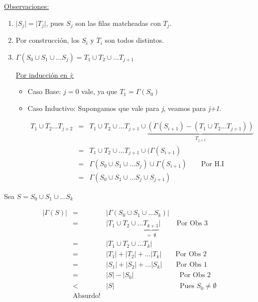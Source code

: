 \documentclass[12pt,a4paper]{report}
\newcounter{neq}
\begin{document}
			\vspace{5mm}
			\underline{Observaciones:}
			\begin{enumerate}
				\item $\lvert S_{j} \rvert = \lvert T_{j} \rvert$, pues $S_{j}$ son las filas matcheadas con $T_{j}$.
				\item Por construcción, los $S_{i}$ y $T_{i}$ son todos distintos.
				\item $\Gamma(S_{0} \cup S_{1} \cup \dotsc S_{j}) = T_{1} \cup T_{2} \cup \dotsc T_{j+1}$
				
					\underline{Por inducción en \textit{j}:}
					\begin{itemize}
						\item Caso Base: $j = 0$ vale, ya que $T_{1} = \Gamma(S_{0})$
						\item Caso Inductivo: Supongamos que vale para \textit{j}, veamos para \textit{j+1}.
						
						\begin{eqnarray}
							\nonumber T_{1} \cup T_{2} \dotsc T_{j+2} &=& T_{1} \cup T_{2} \cup \dotsc T_{j+1} \cup \underbrace{(\Gamma(S_{i+1}) - (T_{1} \cup T_{2} \dotsc T_{j+1}))}_{T_{j+1}} \\
							\nonumber &=& T_{1} \cup T_{2} \cup \dotsc T_{j+1} \cup (\Gamma(S_{i+1}) \\
							\nonumber &=& \Gamma(S_{0} \cup S_{1} \cup \dotsc S_{j}) \cup \Gamma(S_{i+1}) \qquad \text{Por H.I} \\
							\nonumber &=& \Gamma(S_{0} \cup S_{1} \cup \dotsc S_{j} \cup S_{j+1}) 
						\end{eqnarray}
					\end{itemize}
				\end{enumerate}
				
					Sea $S = S_{0} \cup S_{1} \cup \dotsc S_{k}$
					
					\begin{eqnarray}
						\nonumber \lvert \Gamma(S) \rvert &=& \lvert \Gamma(S_{0} \cup S_{1} \cup \dotsc S_{k}) \rvert \\
						\nonumber &=& \lvert T_{1} \cup T_{2} \cup \dotsc \underbrace{T_{k+1}}_{= \; \emptyset} \rvert \qquad \; \text{Por Obs 3} \\
						\nonumber &=& \lvert T_{1} \cup T_{2} \cup \dotsc T_{k} \rvert \\
						\nonumber &=& \lvert T_{1} \rvert + \lvert T_{2} \rvert + \dotsc \lvert T_{k} \rvert \qquad \text{Por Obs 2} \\
						\nonumber &=& \lvert S_{1} \rvert + \lvert S_{2} \rvert + \dotsc \lvert S_{k} \rvert \qquad \text{Por Obs 1} \\
						\nonumber &=& \lvert S \rvert - \lvert S_{0} \rvert \qquad \qquad \qquad \; \; \text{Por Obs 2} \\
						\nonumber &<& \lvert S \rvert \qquad \qquad \qquad \qquad \; \; \; \; \;\text{Pues } S_{0} \neq \emptyset \\
						\nonumber & \text{Absurdo!} &
					\end{eqnarray}
			
\end{document}
